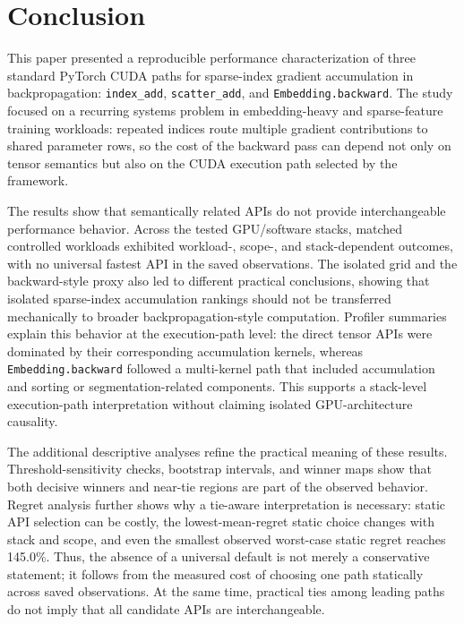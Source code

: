 \section{Conclusion}
\label{sec:conclusion}

This paper presented a reproducible performance characterization of three standard PyTorch CUDA paths for sparse-index gradient accumulation in backpropagation: \texttt{index\_add}, \texttt{scatter\_add}, and \texttt{Embedding.backward}. The study focused on a recurring systems problem in embedding-heavy and sparse-feature training workloads: repeated indices route multiple gradient contributions to shared parameter rows, so the cost of the backward pass can depend not only on tensor semantics but also on the CUDA execution path selected by the framework.

The results show that semantically related APIs do not provide interchangeable performance behavior. Across the tested GPU/software stacks, matched controlled workloads exhibited workload-, scope-, and stack-dependent outcomes, with no universal fastest API in the saved observations. The isolated grid and the backward-style proxy also led to different practical conclusions, showing that isolated sparse-index accumulation rankings should not be transferred mechanically to broader backpropagation-style computation. Profiler summaries explain this behavior at the execution-path level: the direct tensor APIs were dominated by their corresponding accumulation kernels, whereas \texttt{Embedding.backward} followed a multi-kernel path that included accumulation and sorting or segmentation-related components. This supports a stack-level execution-path interpretation without claiming isolated GPU-architecture causality.

The additional descriptive analyses refine the practical meaning of these results. Threshold-sensitivity checks, bootstrap intervals, and winner maps show that both decisive winners and near-tie regions are part of the observed behavior. Regret analysis further shows why a tie-aware interpretation is necessary: static API selection can be costly, the lowest-mean-regret static choice changes with stack and scope, and even the smallest observed worst-case static regret reaches 145.0\%. Thus, the absence of a universal default is not merely a conservative statement; it follows from the measured cost of choosing one path statically across saved observations. At the same time, practical ties among leading paths do not imply that all candidate APIs are interchangeable.

